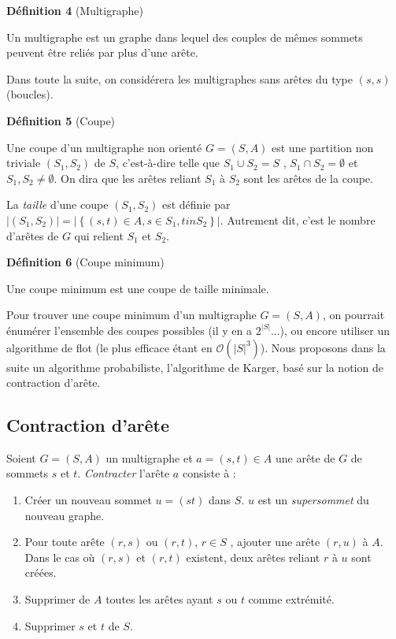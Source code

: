 \documentclass[11pt,a4paper,french]{article}
\renewcommand{\O}[1]{\mathcal{O}\left( #1 \right)}
\begin{document}
\medskip

\textbf{Définition 4} (Multigraphe)

Un multigraphe est un graphe dans lequel des couples de mêmes sommets peuvent être reliés par plus d’une arête.

\medskip

Dans toute la suite, on considérera les multigraphes sans arêtes du type $(s, s)$ (boucles).

\medskip

\textbf{Définition 5} (Coupe)

Une coupe d’un multigraphe non orienté $G = (S , A)$ est une partition non triviale $(S_1 , S_2)$ de $S$, c’est-à-dire telle que $S_1 \cup S_2 = S$ , $S_1 \cap S_2 = \emptyset$ et $S_1 , S_2 \not = \emptyset$. On dira que les arêtes reliant $S_1$ à $S_2$ sont les arêtes de la coupe.


La \emph{taille} d'une coupe $(S_1, S_2)$ est définie par $|(S_1,S_2)| = \left| \left\{ (s,t) \in A, s \in S_1, t in S_2 \right\} \right|$. Autrement dit, c'est le nombre d'arêtes de $G$ qui relient $S_1$ et $S_2$.

\medskip

\textbf{Définition 6} (Coupe minimum)

Une coupe minimum est une coupe de taille minimale.

\medskip

Pour trouver une coupe minimum d’un multigraphe $G = (S , A)$, on pourrait énumérer l’ensemble des coupes possibles (il y en a $2^{|S|}$...), ou encore utiliser un algorithme de flot (le plus efficace étant en $\O{|S|^3}$). Nous proposons dans la suite un algorithme probabiliste, l’algorithme de Karger, basé sur la notion de contraction d’arête.

\subsection{Contraction d'arête}

Soient $G = (S , A)$ un multigraphe et $a = (s, t) \in A$ une arête de $G$ de sommets $s$ et $t$. \emph{Contracter} l’arête $a$ consiste à :
\begin{enumerate}[i]
\item Créer un nouveau sommet $u = (st)$ dans $S$. $u$ est un \emph{supersommet} du nouveau graphe.
\item Pour toute arête $(r, s)$ ou $(r, t)$, $r \in S$ , ajouter une arête $(r, u)$ à $A$. Dans le cas où $(r, s)$ et $(r, t)$ existent, deux arêtes reliant $r$ à $u$ sont créées.
\item Supprimer de $A$ toutes les arêtes ayant $s$ ou $t$ comme extrémité.
\item Supprimer $s$ et $t$ de $S$.
\end{enumerate}
\end{document}
